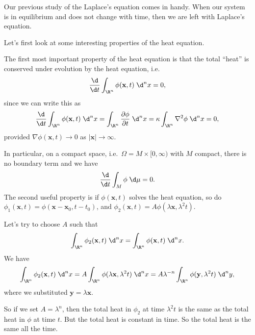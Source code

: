 \documentclass[a4paper]{article}
\begin{document}
Our previous study of the Laplace's equation comes in handy. When our system is in equilibrium and does not change with time, then we are left with Laplace's equation.

Let's first look at some interesting properties of the heat equation.

The first most important property of the heat equation is that the total ``heat'' is conserved under evolution by the heat equation, i.e.
\[
  \frac{\d}{\d t}\int_{\R^n} \phi(\mathbf{x}, t)\;\d^n x = 0,
\]
since we can write this as
\[
  \frac{\d}{\d t}\int_{\R^n} \phi(\mathbf{x}, t)\;\d^n x = \int_{\R^n} \frac{\partial \phi}{\partial t}\; \d^n x = \kappa \int_{\R^n} \nabla^2 \phi \;\d^n x = 0,
\]
provided $\nabla \phi(\mathbf{x}, t) \to 0$ as $|\mathbf{x}|\to \infty$.

In particular, on a compact space, i.e.\ $\Omega = M\times [0, \infty)$ with $M$ compact, there is no boundary term and we have
\[
  \frac{\d}{\d t}\int_M \phi \;\d\mu = 0.
\]
The second useful property is if $\phi(\mathbf{x}, t)$ solves the heat equation, so do $\phi_1(\mathbf{x}, t) = \phi(\mathbf{x} - \mathbf{x}_0, t - t_0)$, and $\phi_2(\mathbf{x}, t) = A \phi(\lambda \mathbf{x}, \lambda^2 t)$.

Let's try to choose $A$ such that
\[
  \int_{\R^n}\phi_2(\mathbf{x}, t) \;\d^n x = \int_{\R^n}\phi(\mathbf{x}, t) \;\d^n x.
\]
We have
\[
  \int_{\R^n} \phi_2(\mathbf{x}, t)\;\d^n x = A\int_{\R^n}\phi(\lambda \mathbf{x}, \lambda^2 t)\;\d^n x = A\lambda^{-n} \int_{\R^n}\phi(\mathbf{y}, \lambda^2 t)\;\d^n y,
\]
where we substituted $\mathbf{y} = \lambda \mathbf{x}$.

So if we set $A = \lambda^n$, then the total heat in $\phi_2$ at time $\lambda^2 t$ is the same as the total heat in $\phi$ at time $t$. But the total heat is constant in time. So the total heat is the same all the time.
\end{document}

